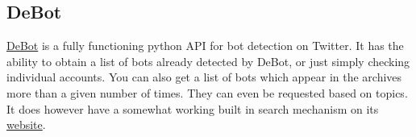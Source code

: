\subsection{DeBot}
\href{https://github.com/nchavoshi/debot_api}{DeBot} is a fully functioning python API for bot detection on Twitter. It has the ability to obtain a list of bots already detected by DeBot, or just simply checking individual accounts. You can also get a list of bots which appear in the archives more than a given number of times. They can even be requested based on topics. It does however have a somewhat working built in search mechanism on its \href{https://www.cs.unm.edu/~chavoshi/debot/}{website}.
